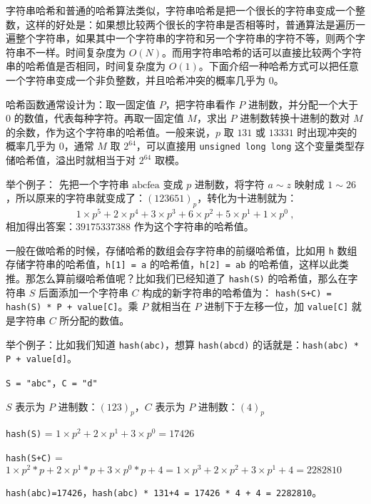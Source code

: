 
字符串哈希和普通的哈希算法类似，字符串哈希是把一个很长的字符串变成一个整数，这样的好处是：如果想比较两个很长的字符串是否相等时，普通算法是遍历一遍整个字符串，如果其中一个字符串的字符和另一个字符串的字符不等，则两个字符串不一样。时间复杂度为 $O(N)$。而用字符串哈希的话可以直接比较两个字符串的哈希值是否相同，时间复杂度为 $O(1)$。下面介绍一种哈希方式可以把任意一个字符串变成一个非负整数，并且哈希冲突的概率几乎为 $0$。

哈希函数通常设计为：取一固定值 $P$，把字符串看作 $P$ 进制数，并分配一个大于 $0$ 的数值，代表每种字符。再取一固定值 $M$，求出 $P$ 进制数转换十进制的数对 $M$ 的余数，作为这个字符串的哈希值。一般来说，$p$ 取 $131$ 或 $13331$ 时出现冲突的概率几乎为 $0$，通常 $M$ 取 $2^{64}$，可以直接用 \verb|unsigned long long| 这个变量类型存储哈希值，溢出时就相当于对 $2^{64}$ 取模。

举个例子：
先把一个字符串 $\text{abcfea}$ 变成 $p$ 进制数，将字符 $a \sim z$ 映射成 $1 \sim 26$，所以原来的字符串就变成了：$(123651)_p$，转化为十进制就为：\begin{equation}
1 \times p^5 + 2 \times p^4 + 3 \times p^3 + 6 \times p^2 + 5 \times p^1 + 1 \times p^0~,
\end{equation}
相加得出答案：$39175337388$ 作为这个字符串的哈希值。

一般在做哈希的时候，存储哈希的数组会存字符串的前缀哈希值，比如用 \verb|h| 数组存储字符串的哈希值，\verb|h[1] = a| 的哈希值，\verb|h[2] = ab| 的哈希值，这样以此类推。那怎么算前缀哈希值呢？比如我们已经知道了 \verb|hash(S)| 的哈希值，那么在字符串 $S$ 后面添加一个字符串 $C$ 构成的新字符串的哈希值为： \verb|hash(S+C) = hash(S) * P + value[C]|。乘 $P$ 就相当在 $P$ 进制下于左移一位，加 \verb|value[C]| 就是字符串 $C$ 所分配的数值。

举个例子：比如我们知道 \verb|hash(abc)|，想算 \verb|hash(abcd)| 的话就是：\verb|hash(abc) * P + value[d]|。

\verb|S = "abc"|，\verb|C = "d"|

$S$ 表示为 $P$ 进制数：$(123)_p$，$C$ 表示为 $P$ 进制数：$(4)_p$

\verb|hash(S)| = $1 \times p^2 + 2 \times p^1 + 3 \times p^0=17426 $

\verb|hash(S+C)| = $1 \times p^2 *p + 2 \times p^1*p + 3 \times p^0*p + 4 = 1 \times p^3 + 2 \times p ^ 2 + 3 \times p^1 + 4=2282810 $

\verb|hash(abc)=17426|，\verb|hash(abc) * 131+4 = 17426 * 4 + 4 = 2282810|。


